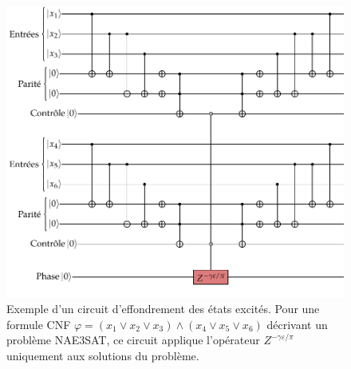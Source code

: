 \begin{figure}[ht!]
    \centering
    \includegraphics[width=1\textwidth]{figures/tower-excited-states-circuit.pdf}
    \caption[Circuit d'effondrement des états excités]{Exemple d'un circuit d'effondrement des états excités. Pour une formule CNF $\varphi = (x_{1} \lor x_{2} \lor x_{3}) \land (x_{4} \lor x_{5} \lor x_{6})$ décrivant un problème NAE3SAT, ce circuit applique l'opérateur $Z^{-\gamma \varepsilon / \pi}$ uniquement aux solutions du problème.}
    \label{fig:tower-excited-states-circuit}
\end{figure}

